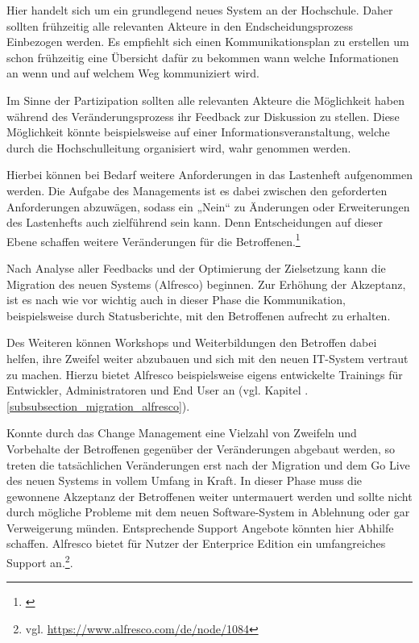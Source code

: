 Hier handelt sich um ein grundlegend neues System an der Hochschule. 
Daher sollten frühzeitig alle relevanten Akteure in den Endscheidungsprozess Einbezogen werden. 
Es empfiehlt sich einen Kommunikationsplan zu erstellen um schon frühzeitig eine Übersicht dafür zu bekommen wann welche Informationen an wenn und auf welchem Weg kommuniziert wird.

Im Sinne der Partizipation sollten alle relevanten Akteure die Möglichkeit haben während des Veränderungsprozess ihr Feedback zur Diskussion zu stellen. Diese Möglichkeit könnte beispielsweise auf einer Informationsveranstaltung, welche durch die Hochschulleitung organisiert wird, wahr genommen werden.

Hierbei können bei Bedarf weitere Anforderungen in das Lastenheft aufgenommen werden. Die Aufgabe des Managements ist es dabei zwischen den geforderten Anforderungen abzuwägen, sodass ein „Nein“ zu Änderungen oder Erweiterungen des Lastenhefts auch zielführend sein kann. Denn Entscheidungen auf dieser Ebene schaffen weitere Veränderungen für die Betroffenen.\footnote{\cite{kleinhesseling_change_2011}}

Nach Analyse aller Feedbacks und der Optimierung der Zielsetzung kann die Migration des neuen Systems (Alfresco) beginnen. Zur Erhöhung der Akzeptanz,  ist es nach wie vor wichtig auch in dieser Phase die Kommunikation, beispielsweise durch Statusberichte, mit den Betroffenen aufrecht zu erhalten.

Des Weiteren können Workshops und Weiterbildungen den Betroffen dabei helfen, ihre Zweifel weiter abzubauen und sich mit den neuen IT-System vertraut zu machen. Hierzu bietet Alfresco beispielsweise eigens entwickelte Trainings für Entwickler, Administratoren und End User an (vgl. Kapitel . \ref{subsubsection_migration_alfresco}).

Konnte durch das Change Management eine Vielzahl von Zweifeln und Vorbehalte der Betroffenen gegenüber der Veränderungen abgebaut werden, so treten die tatsächlichen Veränderungen erst nach der Migration und dem Go Live des neuen Systems in vollem Umfang in Kraft. In dieser Phase muss die gewonnene Akzeptanz der Betroffenen weiter untermauert werden und sollte nicht durch mögliche Probleme mit dem neuen Software-System in Ablehnung oder gar Verweigerung münden. Entsprechende Support Angebote könnten hier Abhilfe schaffen. Alfresco bietet für Nutzer der Enterprice Edition ein umfangreiches  Support an.\footnote{vgl. \url{https://www.alfresco.com/de/node/1084}}.